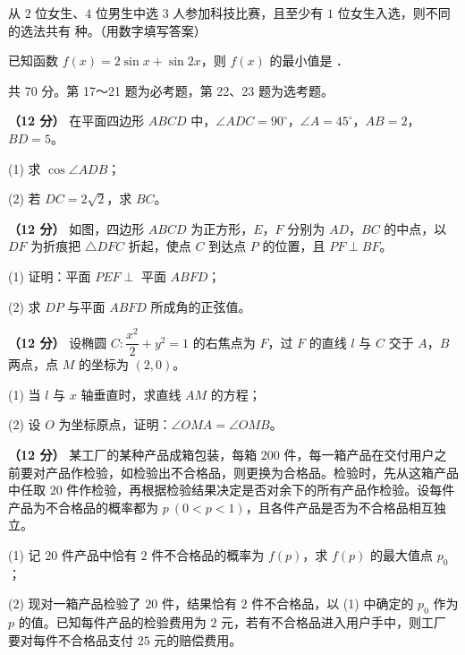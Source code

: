 从 $2$ 位女生、$4$ 位男生中选 $3$ 人参加科技比赛，且至少有 $1$ 位女生入选，则不同的选法共有 \gkblank{} 种。（用数字填写答案）

已知函数 $f(x)=2\sin x+\sin2x$，则 $f(x)$ 的最小值是 \gkblank{}．

\par\medskip


\begin{gktip}
共 70 分。第 17～21 题为必考题，第 22、23 题为选考题。
\end{gktip}


\textbf{（12 分）} 在平面四边形 $ABCD$ 中，$\angle ADC=90^\circ$，$\angle A=45^\circ$，$AB=2$，$BD=5$。

  (1) 求 $\cos\angle ADB$；

  (2) 若 $DC=2\sqrt2$，求 $BC$。

\textbf{（12 分）} 如图，四边形 $ABCD$ 为正方形，$E$，$F$ 分别为 $AD$，$BC$ 的中点，以 $DF$ 为折痕把 $\triangle DFC$ 折起，使点 $C$ 到达点 $P$ 的位置，且 $PF\perp BF$。

\begin{center}\end{center}

  (1) 证明：平面 $PEF\perp$ 平面 $ABFD$；

  (2) 求 $DP$ 与平面 $ABFD$ 所成角的正弦值。

\textbf{（12 分）} 设椭圆 $C:\dfrac{x^{2}}2+y^{2}=1$ 的右焦点为 $F$，过 $F$ 的直线 $l$ 与 $C$ 交于 $A$，$B$ 两点，点 $M$ 的坐标为 $(2,0)$。

  (1) 当 $l$ 与 $x$ 轴垂直时，求直线 $AM$ 的方程；

  (2) 设 $O$ 为坐标原点，证明：$\angle OMA=\angle OMB$。

\textbf{（12 分）} 某工厂的某种产品成箱包装，每箱 $200$ 件，每一箱产品在交付用户之前要对产品作检验，如检验出不合格品，则更换为合格品。检验时，先从这箱产品中任取 $20$ 件作检验，再根据检验结果决定是否对余下的所有产品作检验。设每件产品为不合格品的概率都为 $p\ (0<p<1)$，且各件产品是否为不合格品相互独立。

  (1) 记 $20$ 件产品中恰有 $2$ 件不合格品的概率为 $f(p)$，求 $f(p)$ 的最大值点 $p_0$；

  (2) 现对一箱产品检验了 $20$ 件，结果恰有 $2$ 件不合格品，以 (1) 中确定的 $p_0$ 作为 $p$ 的值。已知每件产品的检验费用为 $2$ 元，若有不合格品进入用户手中，则工厂要对每件不合格品支付 $25$ 元的赔偿费用。

